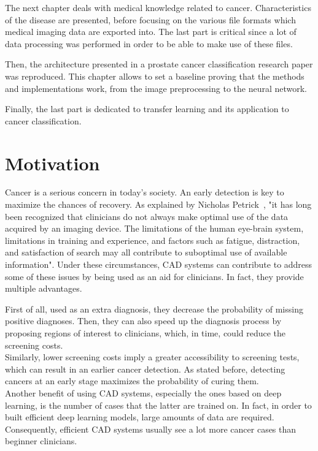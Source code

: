 The next chapter deals with medical knowledge related to cancer. Characteristics of the disease are presented, before focusing on the various file formats which medical imaging data are exported into. The last part is critical since a lot of data processing was performed in order to be able to make use of these files.

Then, the architecture presented in a prostate cancer classification research paper was reproduced. This chapter allows to set a baseline proving that the methods and implementations work, from the image preprocessing to the neural network.

Finally, the last part is dedicated to transfer learning and its application to cancer classification.



\section{Motivation}
Cancer is a serious concern in today's society. An early detection is key to maximize the chances of recovery. As explained by Nicholas Petrick~\cite{50}, "it has long been recognized that clinicians do not always make optimal use of the data acquired by an imaging device. The limitations of the human eye-brain system, limitations in training and experience, and factors such as fatigue, distraction, and satisfaction of search may all contribute to suboptimal use of available information". Under these circumstances, CAD systems can contribute to address some of these issues by being used as an aid for clinicians. In fact, they provide multiple advantages.

First of all, used as an extra diagnosis, they decrease the probability of missing positive diagnoses. Then, they can also speed up the diagnosis process by proposing regions of interest to clinicians, which, in time, could reduce the screening costs.\\
Similarly, lower screening costs imply a greater accessibility to screening tests, which can result in an earlier cancer detection. As stated before, detecting cancers at an early stage maximizes the probability of curing them.\\
Another benefit of using CAD systems, especially the ones based on deep learning, is the number of cases that the latter are trained on. In fact, in order to built efficient deep learning models, large amounts of data are required. Consequently, efficient CAD systems usually see a lot more cancer cases than beginner clinicians.

